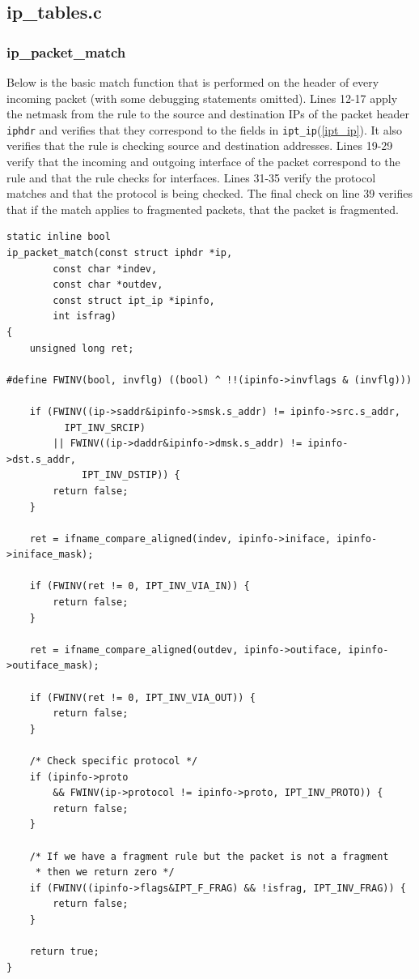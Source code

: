 \documentclass[a4paper,10pt]{article}
\newcommand{\code}[1]{\texttt{#1}}
\begin{document}
\subsection{ip\_tables.c}

\subsubsection{ip\_packet\_match}

Below is the basic match function that is performed on the header of
every incoming packet (with some debugging statements omitted). Lines
12-17 apply the netmask from the rule to the source and destination
IPs of the packet header \code{iphdr} and verifies that they
correspond to the fields in \code{ipt\_ip}(\ref{ipt_ip}). It also
verifies that the rule is checking source and destination
addresses. Lines 19-29 verify that the incoming and outgoing interface
of the packet correspond to the rule and that the rule checks for
interfaces. Lines 31-35 verify the protocol matches and that the
protocol is being checked. The final check on line 39 verifies that if
the match applies to fragmented packets, that the packet is
fragmented.


\lstset{stepnumber=1,frame=single,numbers=left,numberstyle=\footnotesize}

\begin{lstlisting}
static inline bool
ip_packet_match(const struct iphdr *ip,
		const char *indev,
		const char *outdev,
		const struct ipt_ip *ipinfo,
		int isfrag)
{
	unsigned long ret;

#define FWINV(bool, invflg) ((bool) ^ !!(ipinfo->invflags & (invflg)))

	if (FWINV((ip->saddr&ipinfo->smsk.s_addr) != ipinfo->src.s_addr,
		  IPT_INV_SRCIP)
	    || FWINV((ip->daddr&ipinfo->dmsk.s_addr) != ipinfo->dst.s_addr,
		     IPT_INV_DSTIP)) {
		return false;
	}

	ret = ifname_compare_aligned(indev, ipinfo->iniface, ipinfo->iniface_mask);

	if (FWINV(ret != 0, IPT_INV_VIA_IN)) {
		return false;
	}

	ret = ifname_compare_aligned(outdev, ipinfo->outiface, ipinfo->outiface_mask);

	if (FWINV(ret != 0, IPT_INV_VIA_OUT)) {
		return false;
	}

	/* Check specific protocol */
	if (ipinfo->proto
	    && FWINV(ip->protocol != ipinfo->proto, IPT_INV_PROTO)) {
		return false;
	}

	/* If we have a fragment rule but the packet is not a fragment
	 * then we return zero */
	if (FWINV((ipinfo->flags&IPT_F_FRAG) && !isfrag, IPT_INV_FRAG)) {
		return false;
	}

	return true;
}
\end{lstlisting}
\end{document}
